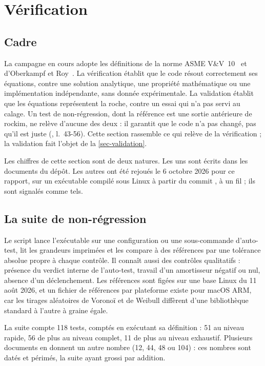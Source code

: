 \section{Vérification}
\label{sec-verification}

\subsection{Cadre}

La campagne en cours adopte les définitions de la norme ASME V\&V~10~\cite{asme2019vv10} et d'Oberkampf et Roy~\cite{oberkampf2010vv}. La vérification établit que le code résout correctement ses équations, contre une solution analytique, une propriété mathématique ou une implémentation indépendante, sans donnée expérimentale. La validation établit que les équations représentent la roche, contre un essai qui n'a pas servi au calage. Un test de non-régression, dont la référence est une sortie antérieure de rockim, ne relève d'aucune des deux : il garantit que le code n'a pas changé, pas qu'il est juste (, l.~43-56). Cette section rassemble ce qui relève de la vérification ; la validation fait l'objet de la \cref{sec-validation}.

Les chiffres de cette section sont de deux natures. Les uns sont écrits dans les documents du dépôt. Les autres ont été rejoués le 6 octobre 2026 pour ce rapport, sur un exécutable compilé sous Linux à partir du commit , à un fil ; ils sont signalés comme tels.

\subsection{La suite de non-régression}

Le script  lance l'exécutable sur une configuration ou une sous-commande d'auto-test, lit les grandeurs imprimées et les compare à des références par une tolérance absolue propre à chaque contrôle. Il connaît aussi des contrôles qualitatifs : présence du verdict interne de l'auto-test, travail d'un amortisseur négatif ou nul, absence d'un déclenchement. Les références sont figées sur une base Linux du 11 août 2026, et un fichier de références par plateforme existe pour macOS ARM, car les tirages aléatoires de Voronoï et de Weibull diffèrent d'une bibliothèque standard à l'autre à graine égale.

La suite compte 118 tests, comptés en exécutant sa définition : 51 au niveau rapide, 56 de plus au niveau complet, 11 de plus au niveau exhaustif. Plusieurs documents en donnent un autre nombre (12, 44, 48 ou 104) : ces nombres sont datés et périmés, la suite ayant grossi par addition.

